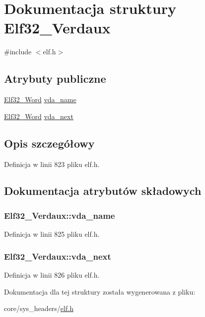 \hypertarget{struct_elf32___verdaux}{\section{Dokumentacja struktury Elf32\-\_\-\-Verdaux}
\label{struct_elf32___verdaux}
}


{\ttfamily \#include $<$elf.\-h$>$}

\subsection*{Atrybuty publiczne}
\begin{DoxyCompactItemize}
\item 
\hyperlink{elf_8h_af5924ece606c732e86f8263a19408e45}{Elf32\-\_\-\-Word} \hyperlink{struct_elf32___verdaux_a5cec12aee4339964d8956351465efa51}{vda\-\_\-name}
\item 
\hyperlink{elf_8h_af5924ece606c732e86f8263a19408e45}{Elf32\-\_\-\-Word} \hyperlink{struct_elf32___verdaux_ab3814a03060eab7d93f1f79d93d3fedd}{vda\-\_\-next}
\end{DoxyCompactItemize}


\subsection{Opis szczegółowy}


Definicja w linii 823 pliku elf.\-h.



\subsection{Dokumentacja atrybutów składowych}
\hypertarget{struct_elf32___verdaux_a5cec12aee4339964d8956351465efa51}{
\subsubsection[{vda\-\_\-name}]{ Elf32\-\_\-\-Verdaux\-::vda\-\_\-name}}\label{struct_elf32___verdaux_a5cec12aee4339964d8956351465efa51}


Definicja w linii 825 pliku elf.\-h.

\hypertarget{struct_elf32___verdaux_ab3814a03060eab7d93f1f79d93d3fedd}{
\subsubsection[{vda\-\_\-next}]{ Elf32\-\_\-\-Verdaux\-::vda\-\_\-next}}\label{struct_elf32___verdaux_ab3814a03060eab7d93f1f79d93d3fedd}


Definicja w linii 826 pliku elf.\-h.



Dokumentacja dla tej struktury została wygenerowana z pliku\-:\begin{DoxyCompactItemize}
\item 
core/sys\-\_\-headers/\hyperlink{elf_8h}{elf.\-h}\end{DoxyCompactItemize}
